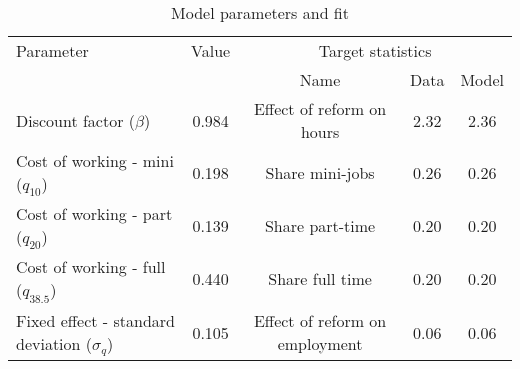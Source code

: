 \begin{table}[htbp]\caption{Model parameters and fit}\label{table:model_param}\centering\footnotesize\begin{tabular}{lcccc} \toprule  Parameter & Value & \multicolumn{3}{c}{Target statistics}  \\\cline{3-5}  &  &  Name & Data & Model  \\\midrule    Discount factor ($\beta$)      &0.984& Effect of reform on hours   & 2.32 &2.36\\ Cost of working - mini ($q_{10}$)   &0.198& Share mini-jobs           & 0.26 &0.26\\ Cost of working - part ($q_{20}$)   &0.139& Share part-time           & 0.20 &0.20\\ Cost of working - full ($q_{38.5}$)      &0.440& Share full time      & 0.20 &0.20\\ Fixed effect - standard deviation ($\sigma_q$)   &0.105& Effect of reform on employment   & 0.06&0.06\\  \bottomrule\end{tabular}\end{table}